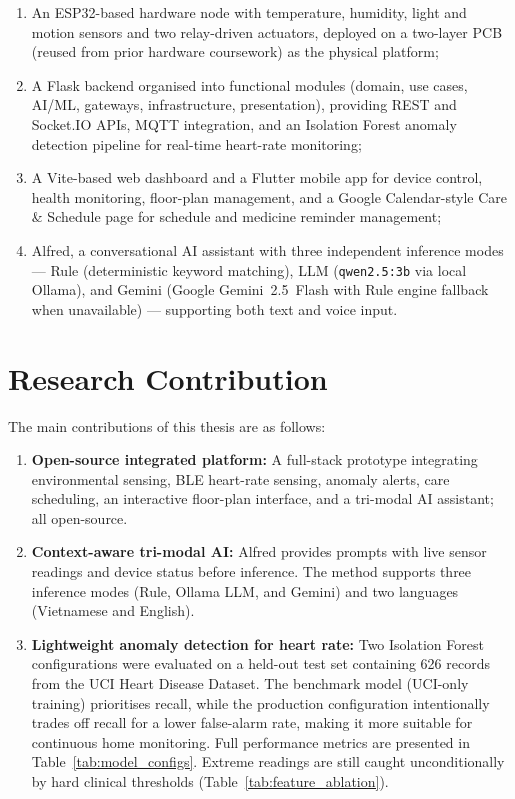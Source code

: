 \begin{enumerate}
    \item An ESP32-based hardware node with temperature, humidity, light and motion sensors and two relay-driven actuators, deployed on a two-layer PCB (reused from prior hardware coursework) as the physical platform;
    \item A Flask backend organised into functional modules (domain, use cases, AI/ML, gateways, infrastructure, presentation), providing REST and Socket.IO APIs, MQTT integration, and an Isolation Forest anomaly detection pipeline for real-time heart-rate monitoring;
    \item A Vite-based web dashboard and a Flutter mobile app for device control, health monitoring, floor-plan management, and a Google Calendar-style Care \& Schedule page for schedule and medicine reminder management;
    \item Alfred, a conversational AI assistant with three independent inference modes --- Rule (deterministic keyword matching), LLM (\texttt{qwen2.5:3b} via local Ollama), and Gemini (Google Gemini~2.5~Flash with Rule engine fallback when unavailable) --- supporting both text and voice input.

\end{enumerate}

\section{Research Contribution}
\label{sec:contribution}

The main contributions of this thesis are as follows:

\begin{enumerate}

\item \textbf{Open-source integrated platform:} A full-stack prototype integrating environmental sensing, BLE heart-rate sensing, anomaly alerts, care scheduling, an interactive floor-plan interface, and a tri-modal AI assistant; all open-source.

\item \textbf{Context-aware tri-modal AI:} Alfred provides prompts with live sensor readings and device status before inference. The method supports three inference modes (Rule, Ollama LLM, and Gemini) and two languages (Vietnamese and English).

\item \textbf{Lightweight anomaly detection for heart rate:} Two Isolation Forest configurations were evaluated on a held-out test set containing 626 records from the UCI Heart Disease Dataset. The benchmark model (UCI-only training) prioritises recall, while the production configuration intentionally trades off recall for a lower false-alarm rate, making it more suitable for continuous home monitoring. Full performance metrics are presented in Table~\ref{tab:model_configs}. Extreme readings are still caught unconditionally by hard clinical thresholds (Table~\ref{tab:feature_ablation}).

\end{enumerate}

